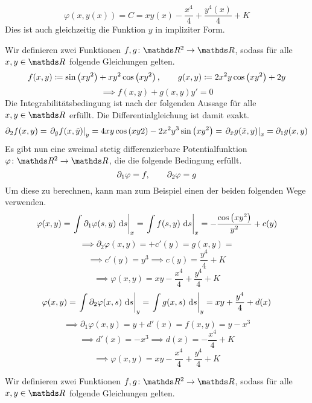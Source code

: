 \begin{atiSolution}
\begin{atiSubtaskSolutions}
{\begin{atiSubtaskSolutions}
{          \[
            \varphi(x,y(x)) = C = xy(x) - \frac{x^4}{4} + \frac{y^4(x)}{4} + K
          \]
          Dies ist auch gleichzeitig die Funktion $y$ in impliziter Form.
        }
        \item[\localref{aii}]{
          Wir definieren zwei Funktionen $\func{f,g}{\setR^2}{\setR}$, sodass für alle $x,y\in\setR$ folgende Gleichungen gelten.
          \[
            f(x,y) \coloneqq \sin\left( xy^2 \right) + xy^2\cos\left( xy^2 \right) ,\qquad g(x,y) \coloneqq 2x^2y\cos\left( xy^2 \right) + 2y
          \]
          \[
            \implies f(x,y) + g(x,y)y' = 0
          \]
          Die Integrabilitätsbedingung ist nach der folgenden Aussage für alle $x,y\in\setR$ erfüllt.
          Die Differentialgleichung ist damit exakt.
          \[
            \partial_2f(x,y) = \left.\partial_{\tilde{y}} f(x,\tilde{y})\right\vert_{y}^{} = 4xy\cos\left( xy2 \right) - 2x^2y^3\sin\left( xy^2 \right) = \left.\partial_{\tilde{x}} g(\tilde{x},y)\right\vert_{x}^{} = \partial_1g(x,y)
          \]
          Es gibt nun eine zweimal stetig differenzierbare Potentialfunktion $\func{\varphi}{\setR^2}{\setR}$, die die folgende Bedingung erfüllt.
          \[
            \partial_1\varphi = f ,\qquad \partial_2\varphi = g
          \]
          Um diese zu berechnen, kann man zum Beispiel einen der beiden folgenden Wege verwenden.
          \[
            \varphi(x,y) = \left.\int \partial_1\varphi(s,y)\ \mathrm{d} s\right\vert_{x}^{} = \left.\int f(s,y)\ \mathrm{d} s\right\vert_{x}^{} = -\frac{\cos\left( xy^2 \right)}{y^2} + c(y)
          \]
          \[
            \implies \partial_2\varphi(x,y) = + c'(y) = g(x,y) =
          \]
          \[
            \implies c'(y) = y^3 \implies c(y) = \frac{y^4}{4} + K
          \]
          \[
            \implies \varphi(x,y) = xy - \frac{x^4}{4} + \frac{y^4}{4} + K
          \]
          \[
            \varphi(x,y) = \left.\int \partial_2\varphi(x,s)\ \mathrm{d} s\right\vert_{y}^{} = \left.\int g(x,s)\ \mathrm{d} s\right\vert_{y}^{} = xy + \frac{y^4}{4} + d(x)
          \]
          \[
            \implies \partial_1\varphi(x,y) = y + d'(x) = f(x,y) = y - x^3
          \]
          \[
            \implies d'(x) = -x^3 \implies d(x) = -\frac{x^4}{4} + K
          \]
          \[
            \implies \varphi(x,y) = xy - \frac{x^4}{4} + \frac{y^4}{4} + K
          \]
        }
      \end{atiSubtaskSolutions}
    }
    \item[\localref{b}]{
      \begin{atiSubtaskSolutions}
        \item[\localref{bi}]{
          Wir definieren zwei Funktionen $\func{f,g}{\setR^2}{\setR}$, sodass für alle $x,y\in\setR$ folgende Gleichungen gelten.
}
\end{atiSubtaskSolutions}}
\end{atiSubtaskSolutions}
\end{atiSolution}
